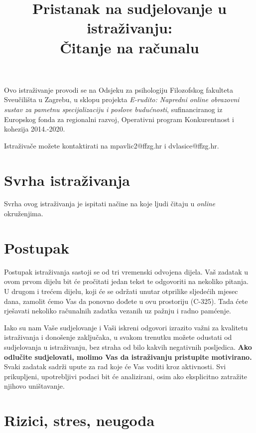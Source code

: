 \documentclass[11pt]{article}
\title{\bfseries \large Pristanak na sudjelovanje u istraživanju:\\
        \Large Čitanje na računalu}
\date{}
\author{}
\begin{document}
\vspace{-4em}

\maketitle

\vspace*{-4em}

\noindent Ovo istraživanje provodi se na Odsjeku za psihologiju Filozofskog 
fakulteta Sveučilišta u Zagrebu, u sklopu projekta \textit{E-rudito: Napredni 
online obrazovni sustav za pametnu specijalizaciju i poslove budućnosti}, 
sufinanciranog iz Europskog fonda za regionalni razvoj, Operativni program 
Konkurentnost i kohezija 2014.-2020.

\vspace{6pt}

\noindent Istraživače možete kontaktirati na mpavlic2@ffzg.hr i dvlasice@ffzg.hr.

\section{Svrha istraživanja}

Svrha ovog istraživanja je ispitati načine na koje ljudi čitaju u \textit{online}
okruženjima.

\section{Postupak}

Postupak istraživanja sastoji se od tri vremenski odvojena dijela.
Vaš zadatak u ovom prvom dijelu bit će pročitati jedan tekst te odgovoriti na nekoliko pitanja.
U drugom i trećem dijelu, koji će se održati unutar otprilike sljedećih mjesec dana, 
zamolit ćemo  Vas da ponovno dođete u ovu prostoriju (C-325). Tada ćete rješavati 
nekoliko računalnih zadatka vezanih uz pažnju i radno pamćenje.


Iako su nam Vaše sudjelovanje i Vaši iskreni odgovori izrazito važni za
kvalitetu istraživanja i donošenje zaključaka, u svakom trenutku možete odustati
od sudjelovanja u istraživanju, bez straha od bilo kakvih negativnih posljedica. 
\textbf{Ako odlučite sudjelovati, molimo Vas da istraživanju pristupite motivirano.}
Svaki zadatak sadrži upute za rad koje će Vas voditi kroz aktivnosti.
Svi prikupljeni, upotrebljivi podaci bit će analizirani, osim ako eksplicitno
zatražite njihovo uništavanje.

\section{Rizici, stres, neugoda}
\end{document}
